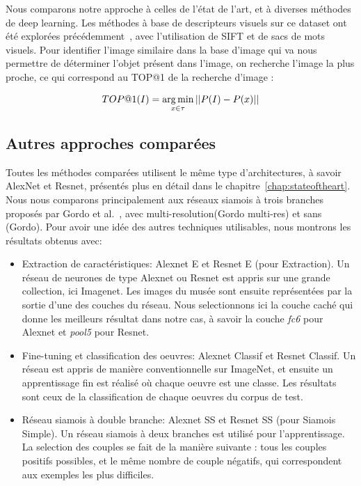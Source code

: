 Nous comparons notre approche à celles de l'état de l'art, et à diverses méthodes de deep learning. 
Les méthodes à base de descripteurs visuels sur ce dataset ont été explorées précédemment~\cite{portaz2017construction}, avec l’utilisation de SIFT et de sacs de mots visuels. 
Pour identifier l'image similaire dans la base d'image qui va nous permettre de déterminer l'objet présent dans l'image, on recherche l'image la plus proche, ce qui correspond au TOP@1 de la recherche d'image :
 
\begin{equation}
TOP@1(I) = \operatorname*{arg\,min}_{x \in \tau} ||P(I) - P(x)||
\label{eq:simrank}
\end{equation}


\subsection{Autres approches comparées}
Toutes les méthodes comparées utilisent le même type d'architectures, à savoir AlexNet et Resnet, présentés plus en détail dans le chapitre~\ref{chap:stateoftheart}. 
Nous nous comparons principalement aux réseaux siamois à trois branches proposés par Gordo et al.~\cite{gordo2016deep}, avec multi-resolution(Gordo multi-res) et sans (Gordo). 
Pour avoir une idée des autres techniques utilisables, nous montrons les résultats obtenus avec:

\begin{itemize}
  \item Extraction de caractéristiques: Alexnet E et Resnet E (pour Extraction). Un réseau de neurones de type Alexnet ou Resnet est appris sur une grande collection, ici Imagenet. 
	Les images du musée sont ensuite représentées par la sortie d'une des couches du réseau. 
	Nous selectionnons ici la couche caché qui donne les meilleurs résultat dans notre cas, à savoir la couche \textit{fc6} pour Alexnet et \textit{pool5} pour Resnet. 
	\item Fine-tuning et classification des oeuvres: Alexnet Classif et Resnet Classif. Un réseau est appris de manière conventionnelle sur ImageNet, et ensuite un apprentissage fin est réalisé où chaque oeuvre est une classe. Les résultats sont ceux de la classification de chaque oeuvres du corpus de test.
	\item Réseau siamois à double branche: Alexnet SS et Resnet SS (pour Siamois Simple). Un réseau siamois à deux branches est utilisé pour l'apprentissage. La selection des couples se fait de la manière suivante : tous les couples positifs possibles, et le même nombre de couple négatifs, qui correspondent aux exemples les plus difficiles. 
\end{itemize}



